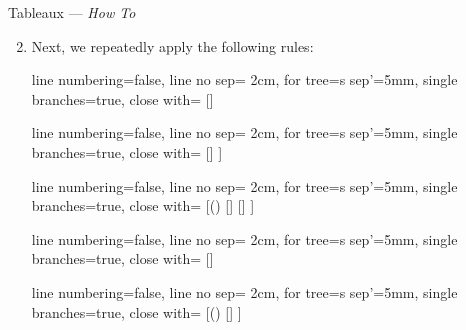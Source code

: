 \documentclass[../slides.tex]{subfiles}
\begin{document}
\begin{frame}{Tableaux --- \emph{How To}}

	\begin{enumerate}
	\setcounter{enumi}{1}
	
	\item Next, we repeatedly apply the following rules: 
					\vspace{2ex}
				
					\begin{center}
							{\tiny		
	
					\begin{prooftree}
					{
					line numbering=false,
					line no sep= 2cm,
					for tree={s sep'=5mm},
					single branches=true,
					close with=\xmark
					}
					[\neg\neg \phi [\phi ] ]
					\end{prooftree}
					\begin{prooftree}
					{
					line numbering=false,
					line no sep= 2cm,
					for tree={s sep'=5mm},
					single branches=true,
					close with=\xmark
					}
					[\phi\land\psi [\phi [\psi ] ] ]
					\end{prooftree}
					\begin{prooftree}
					{
					line numbering=false,
					line no sep= 2cm,
					for tree={s sep'=5mm},
					single branches=true,
					close with=\xmark
					}
					[\neg (\phi\land\psi) [\neg \phi ] [\neg \psi ] ]
					\end{prooftree}
					\begin{prooftree}
					{
					line numbering=false,
					line no sep= 2cm,
					for tree={s sep'=5mm},
					single branches=true,
					close with=\xmark
					}
					[\phi\lor\psi [\phi ] [\psi ] ]
					\end{prooftree}
					\begin{prooftree}
					{
					line numbering=false,
					line no sep= 2cm,
					for tree={s sep'=5mm},
					single branches=true,
					close with=\xmark
					}
					[\neg(\phi\lor\psi) [\neg\phi [\neg\psi ] ] ]
					\end{prooftree}

					\vspace{2ex}

}
\end{center}
\end{enumerate}
\end{frame}
\end{document}
